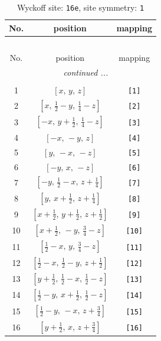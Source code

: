 \documentclass[fleqn,8pt]{jsarticle}
\begin{document}
\begin{longtable}{ccc}
\caption{Wyckoff site: {\tt 16e}, site symmetry: {\tt 1}}
 \\
 \hline \hline
No. & position & mapping \\ \hline \endfirsthead

\multicolumn{2}{l}{\tablename\ \thetable{}} \\
 \hline \hline
No. & position & mapping \\ \hline \endhead

 \hline \hline
\multicolumn{2}{r}{\footnotesize\it continued ...} \\ \endfoot

 \hline \hline
\multicolumn{2}{r}{} \\ \endlastfoot

1 & $\left[ x,\, y,\, z \right]$ & {\tt [1]} \\ \hline
2 & $\left[ x,\, \frac{1}{2} - y,\, \frac{1}{4} - z \right]$ & {\tt [2]} \\ \hline
3 & $\left[ - x,\, y + \frac{1}{2},\, \frac{1}{4} - z \right]$ & {\tt [3]} \\ \hline
4 & $\left[ - x,\, - y,\, z \right]$ & {\tt [4]} \\ \hline
5 & $\left[ y,\, - x,\, - z \right]$ & {\tt [5]} \\ \hline
6 & $\left[ - y,\, x,\, - z \right]$ & {\tt [6]} \\ \hline
7 & $\left[ - y,\, \frac{1}{2} - x,\, z + \frac{1}{4} \right]$ & {\tt [7]} \\ \hline
8 & $\left[ y,\, x + \frac{1}{2},\, z + \frac{1}{4} \right]$ & {\tt [8]} \\ \hline
9 & $\left[ x + \frac{1}{2},\, y + \frac{1}{2},\, z + \frac{1}{2} \right]$ & {\tt [9]} \\ \hline
10 & $\left[ x + \frac{1}{2},\, - y,\, \frac{3}{4} - z \right]$ & {\tt [10]} \\ \hline
11 & $\left[ \frac{1}{2} - x,\, y,\, \frac{3}{4} - z \right]$ & {\tt [11]} \\ \hline
12 & $\left[ \frac{1}{2} - x,\, \frac{1}{2} - y,\, z + \frac{1}{2} \right]$ & {\tt [12]} \\ \hline
13 & $\left[ y + \frac{1}{2},\, \frac{1}{2} - x,\, \frac{1}{2} - z \right]$ & {\tt [13]} \\ \hline
14 & $\left[ \frac{1}{2} - y,\, x + \frac{1}{2},\, \frac{1}{2} - z \right]$ & {\tt [14]} \\ \hline
15 & $\left[ \frac{1}{2} - y,\, - x,\, z + \frac{3}{4} \right]$ & {\tt [15]} \\ \hline
16 & $\left[ y + \frac{1}{2},\, x,\, z + \frac{3}{4} \right]$ & {\tt [16]} \\
\end{longtable}
\end{document}
